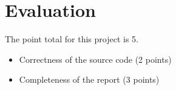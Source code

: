 \section*{Evaluation}
The point total for this project is 5.
\begin{itemize}
\item Correctness of the source code (2 points)
\item	Completeness of the report (3 points)
\end{itemize}

